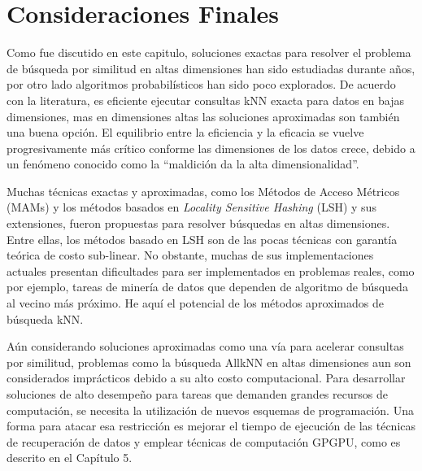 \section{Consideraciones Finales}

Como fue discutido en este capitulo,  soluciones exactas para  resolver el problema de búsqueda por similitud en altas dimensiones han sido estudiadas durante años, por otro lado algoritmos probabilísticos han sido poco explorados. De acuerdo con la literatura, es eficiente ejecutar consultas kNN exacta para datos en bajas dimensiones, mas en dimensiones altas las soluciones aproximadas son también una buena opción. El equilibrio entre la eficiencia y la eficacia se vuelve progresivamente más crítico conforme las dimensiones de los datos crece, debido a un fenómeno conocido como   la ``maldición  da la alta dimensionalidad''.

Muchas técnicas exactas y aproximadas, como los Métodos de Acceso Métricos (MAMs) y los métodos basados en \textit{Locality Sensitive Hashing} (LSH) y sus extensiones, fueron propuestas para resolver búsquedas en altas dimensiones.  Entre ellas, los métodos basado en LSH son de las pocas técnicas con garantía teórica de costo sub-linear. No obstante, muchas de sus implementaciones actuales presentan dificultades para ser implementados en problemas reales, como por ejemplo, tareas de minería de datos que dependen de algoritmo de búsqueda al vecino más próximo. He aquí el potencial de los métodos aproximados de búsqueda kNN.

Aún considerando soluciones aproximadas como una vía para acelerar consultas por similitud, problemas como la búsqueda AllkNN en altas dimensiones aun son considerados imprácticos debido a su alto costo computacional. Para desarrollar soluciones de alto desempeño para tareas que demanden grandes recursos de computación, se necesita la utilización de nuevos esquemas de programación. Una forma para atacar esa restricción es mejorar el tiempo de ejecución de las técnicas de recuperación de datos y emplear técnicas de computación GPGPU, como es descrito en el Capítulo 5.


